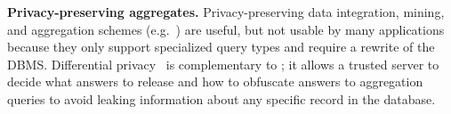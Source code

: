 


 
{\bf Privacy-preserving aggregates.}
Privacy-preserving data integration, mining, and aggregation
schemes (e.g.~\cite{Kantarcioglu-Clifton-2005, Xiong-2007}) are
useful, but not usable by many applications because they only support
specialized query types and require a rewrite of the DBMS\@.
Differential privacy~\cite{dwork-survey} is complementary
to \name{}; it allows a trusted server to decide what answers to
release and how to obfuscate answers to aggregation queries to avoid
leaking information about any specific record in the database.

